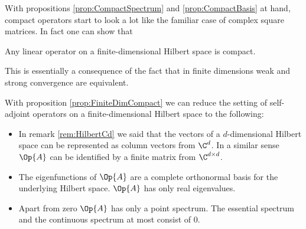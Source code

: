 With propositions \ref{prop:CompactSpectrum} and \ref{prop:CompactBasis}
at hand, compact operators start to look a lot like the familiar case
of complex square matrices.
In fact one can show that~\cite[p.~43]{Helffer2013}
\begin{prop}
	\label{prop:FiniteDimCompact}
	Any linear operator on a finite-dimensional Hilbert space is compact.
\end{prop}
This is essentially a consequence of the fact that in finite dimensions
weak and strong convergence are equivalent.

\begin{rem}
With proposition \ref{prop:FiniteDimCompact}
we can reduce the setting of self-adjoint operators on a finite-dimensional
Hilbert space to the following:
\begin{itemize}
	\item In remark \vref{rem:HilbertCd} we said that the vectors
		of a $d$-dimensional Hilbert space
		can be represented as column vectors from $\C^d$.
		In a similar sense $\Op{A}$ can be identified by a finite matrix from
		$\C^{d \times d}$.
	\item The eigenfunctions of $\Op{A}$ are a complete orthonormal
		basis for the underlying Hilbert space.
		$\Op{A}$ has only real eigenvalues.
	\item Apart from zero $\Op{A}$ has only a point spectrum.
		The essential spectrum and the continuous spectrum at most consist of $0$.
\end{itemize}
\end{rem}

